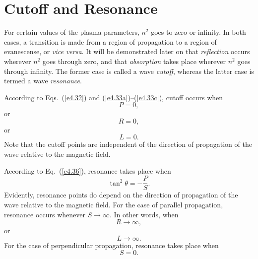 \section{Cutoff and Resonance}
For certain values of the plasma parameters, $n^2$ goes to zero
or infinity. In both cases, a transition is made from a region 
of propagation to a region of evanescense, or {\em vice versa}. 
It will be demonstrated later on that {\em reflection}\/ occurs 
wherever $n^2$ goes through zero, and that {\em absorption}\/ takes place 
wherever $n^2$ goes through infinity. The former case is called a
wave {\em cutoff}, whereas the latter case is termed a wave {\em resonance}. 

According to Eqs.~(\ref{e4.32}) and (\ref{e4.33a})--(\ref{e4.33c}), cutoff occurs when
\begin{equation}
P=0,
\end{equation}
or
\begin{equation}
R=0,
\end{equation}
or
\begin{equation}
L=0.
\end{equation}
Note that the cutoff points are independent of the direction of
propagation of the wave relative to the magnetic field.

According to Eq.~(\ref{e4.36}), resonance takes place when
\begin{equation}
\tan^2\theta = -\frac{P}{S}.
\end{equation}
Evidently, resonance points do depend on the direction of propagation
of the wave relative to the magnetic field. For the case of
parallel propagation, resonance occurs whenever $S\rightarrow \infty$.
In other words, when
\begin{equation}
R\rightarrow \infty,
\end{equation}
or
\begin{equation}
L\rightarrow \infty.
\end{equation}
For the case of perpendicular propagation, resonance takes place
when
\begin{equation}
S = 0.
\end{equation}

